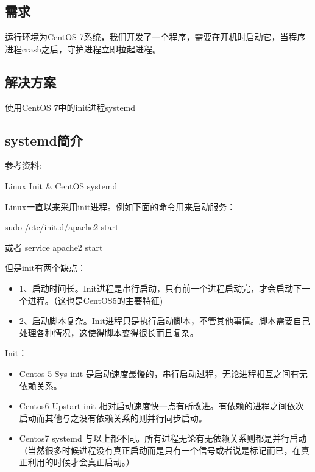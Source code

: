 \documentclass[letterpaper,10pt,english]{sphinxmanual}
\begin{document}
\subsection{需求}
\label{\detokenize{common_service/systemd:id1}}\label{\detokenize{common_service/systemd::doc}}
运行环境为CentOS 7系统，我们开发了一个程序，需要在开机时启动它，当程序进程crash之后，守护进程立即拉起进程。


\subsection{解决方案}
\label{\detokenize{common_service/systemd:id2}}
使用CentOS 7中的init进程systemd


\subsection{systemd简介}
\label{\detokenize{common_service/systemd:systemd}}
参考资料:

Linux Init \& CentOS systemd

Linux一直以来采用init进程。例如下面的命令用来启动服务：

%
\begin{sphinxVerbatim}[commandchars=\\\{\},numbers=left,firstnumber=1,stepnumber=1]
\PYGZdl{} sudo /etc/init.d/apache2 start

或者\PYGZdl{} service apache2 start
\end{sphinxVerbatim}

但是init有两个缺点：
\begin{itemize}
\item {} 
1、启动时间长。Init进程是串行启动，只有前一个进程启动完，才会启动下一个进程。（这也是CentOS5的主要特征)

\item {} 
2、启动脚本复杂。Init进程只是执行启动脚本，不管其他事情。脚本需要自己处理各种情况，这使得脚本变得很长而且复杂。

\end{itemize}

Init：
\begin{itemize}
\item {} 
Centos 5 Sys init 是启动速度最慢的，串行启动过程，无论进程相互之间有无依赖关系。

\item {} 
Centos6 Upstart init 相对启动速度快一点有所改进。有依赖的进程之间依次启动而其他与之没有依赖关系的则并行同步启动。

\item {} 
Centos7 systemd 与以上都不同。所有进程无论有无依赖关系则都是并行启动（当然很多时候进程没有真正启动而是只有一个信号或者说是标记而已，在真正利用的时候才会真正启动。）

\end{itemize}
\end{document}
